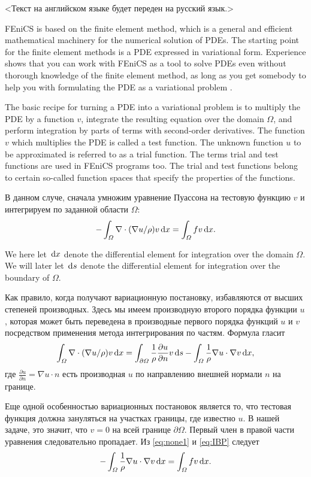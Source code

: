 <Текст на английском языке будет переден на русский язык.>

FEniCS is based on the finite element method, which is a general and efficient
mathematical machinery for the numerical solution of PDEs. The starting
point for the finite element methods is a PDE expressed in variational form.
Experience shows that you can work with FEniCS as
a tool to solve PDEs even without thorough knowledge of the finite element
method, as long as you get somebody to help you with formulating the PDE
as a variational problem \cite[с. 12]{FEniCS}.

The basic recipe for turning a PDE into a variational problem is to multiply
the PDE by a function $v$, integrate the resulting equation over the domain $\Omega$,
and perform integration by parts of terms with second-order derivatives. The
function $v$ which multiplies the PDE is called a test function. The unknown
function $u$ to be approximated is referred to as a trial function. The terms
trial and test functions are used in FEniCS programs too. The trial and
test functions belong to certain so-called function spaces that specify the
properties of the functions.

В данном случе, сначала умножим уравнение Пуассона на тестовую функцию $v$ и интегрируем по заданной области $\Omega$: 
\begin{equation} \label{eq:none1}
  - \int_\varOmega \nabla \cdot (\nabla u / \rho)v \, \mathrm{d}x 
  = \int_\varOmega f v \, \mathrm{d}x.
\end{equation}

We here let $\, \mathrm{d}x$ denote the differential element for integration over the domain
$\Omega$. We will later let $\, \mathrm{d}s$ denote the differential element for integration over
the boundary of $\Omega$.

Как правило, когда получают вариационную постановку, избавляются от высших степеней производных.
Здесь мы имеем производную второго порядка функции $u$, которая может быть переведена в производные первого порядка функций $u$ и $v$ посредством применения метода интегрирования по частям.
Формула гласит
\begin{equation} \label{eq:IBP}
  \int_\varOmega \nabla \cdot (\nabla u / \rho)v \, \mathrm{d}x
= \int_{\partial\varOmega} \frac 1 \rho {\partial u\over\partial n}v \, \mathrm{d}s
- \int_\varOmega \frac 1 \rho \nabla u\cdot\nabla v \, \mathrm{d}x,
\end{equation}
где $\frac{\partial u}{\partial n} = \nabla u \cdot n$ есть производная $u$ по направлению внешней нормали $n$ на границе.

Еще одной особенностью вариационных постановок является то, что тестовая функция должна зануляться на участках границы, где известно $u$.
В нашей задаче, это значит, что $v = 0$ на всей границе $\partial\Omega$.
Первый член в правой части уравнения следовательно пропадает.
Из \eqref{eq:none1} и \eqref{eq:IBP} следует
\begin{equation} \label{eq:weakform}
- \int_\varOmega \frac 1 \rho \nabla u\cdot\nabla v \, \mathrm{d}x = \int_\varOmega f v \, \mathrm{d}x.
\end{equation}

